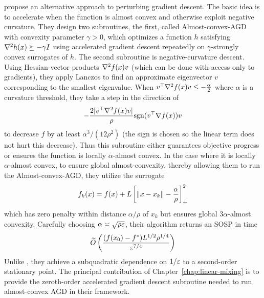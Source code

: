 \citet{carmon2018accelerated} propose an alternative approach to perturbing gradient descent. The basic idea is to accelerate when the function is almost convex and otherwise exploit negative curvature. They design two subroutines, the first, called Almost-convex-AGD with convexity parameter $\gamma > 0$, which optimizes a function $h$ satisfying $\nabla^2 h(x) \succeq -\gamma I$ using accelerated gradient descent repeatedly on $\gamma$-strongly convex surrogates of $h$. The second subroutine is negative-curvature descent. Using Hessian-vector products $\nabla^2 f(x) v$ (which can be done with access only to gradients), they apply Lanczos to find an approximate eigenvector $v$ corresponding to the smallest eigenvalue. When $v^\top \nabla^2 f(x) v \leq -\frac{\alpha}{2}$ where $\alpha$ is a curvature threshold, they take a step in the direction of
\begin{align*}
    -\frac{2|v^\top \nabla^2 f(x) v|}{\rho} \mathrm{sgn}(v^\top \nabla f(x)) v
\end{align*}
to decrease $f$ by at least $\alpha^3/(12\rho^2)$ (the sign is chosen so the linear term does not hurt this decrease). Thus this subroutine either guarantees objective progress or ensures the function is locally $\alpha$-almost convex. In the case where it is locally $\alpha$-almost convex, to ensure global almost-convexity, thereby allowing them to run the Almost-convex-AGD, they utilize the surrogate
\begin{align*}
    f_k(x) = f(x) + L\left[\left\lVert x-x_k \right\rVert - \frac{\alpha}{\rho} \right]_{+}^2
\end{align*}
which has zero penalty within distance $\alpha/\rho$ of $x_k$ but ensures global $3\alpha$-almost convexity. Carefully choosing $\alpha \asymp \sqrt{\rho \varepsilon}$, their algorithm returns an SOSP in time
\begin{align*}
    \widetilde{O}\left(\frac{(f(x_0) - f^*) L^{1/2} \rho^{1/4}}{\varepsilon^{7/4}}\right)
\end{align*}
Unlike \citet{ren2023escaping}, they achieve a subquadratic dependence on $1/\varepsilon$ to a second-order stationary point. The principal contribution of Chapter~\ref{chap:linear-mixing} is to provide the zeroth-order accelerated gradient descent subroutine needed to run almost-convex AGD in their framework.
